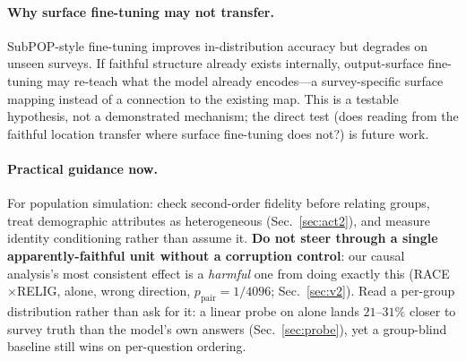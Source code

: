 \paragraph{Why surface fine-tuning may not transfer.}
SubPOP-style fine-tuning \citep{subpop2025} improves in-distribution
accuracy but degrades on unseen surveys. If faithful structure already
exists internally, output-surface fine-tuning may re-teach what the model
already encodes---a survey-specific surface mapping instead of a
connection to the existing map. This is a testable hypothesis, not a
demonstrated mechanism; the direct test (does reading from the faithful
location transfer where surface fine-tuning does not?) is future work.

\paragraph{Practical guidance now.}
For population simulation: check second-order fidelity before relating
groups, treat demographic attributes as heterogeneous
(Sec.~\ref{sec:act2}), and measure identity conditioning rather than
assume it. \textbf{Do not steer through a single apparently-faithful unit
without a corruption control}: our causal analysis's most consistent
effect is a \emph{harmful} one from doing exactly this
(RACE$\times$RELIG, \starhead{} alone, wrong direction,
$p_{\text{pair}}=1/4096$; Sec.~\ref{sec:v2}). Read a per-group
distribution rather than ask for it: a linear probe on \starhead{} alone
lands $21$--$31\%$ closer to survey truth than the model's own answers
(Sec.~\ref{sec:probe}), yet a group-blind baseline still wins on
per-question ordering.
